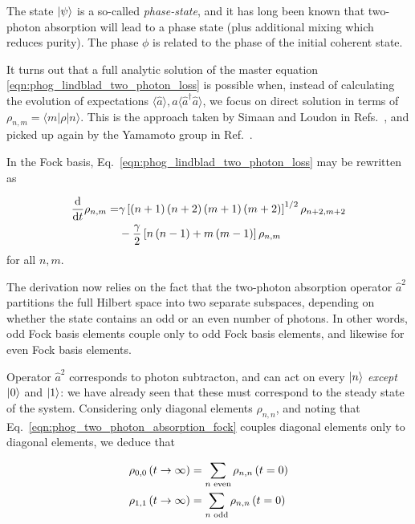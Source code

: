 \noindent The state $\ket{\psi}$ is a so-called \emph{phase-state}, and it has long been known that two-photon absorption will lead to a phase state \cite{Ezaki1999} (plus additional mixing \cite{Alexanian2000, Ezaki2000} which reduces purity). The phase $\phi$ is related to the phase of the initial coherent state. 

It turns out that a full analytic solution of the master equation \ref{eqn:phog_lindblad_two_photon_loss} is possible \cite{Simaan1975, Simaan1976, Ezaki1999, Ezaki2000} when, instead of calculating the evolution of expectations $\langle \hat{a}\rangle, a\langle \hat{a}^\dagger \hat{a}\rangle$, we focus on direct solution in terms of $\rho_{n, m} = \langle m | \rho | n \rangle$. This is the approach taken by Simaan and Loudon in Refs.~\cite{Simaan1975, Simaan1976}, and picked up again by the Yamamoto group in Ref.~\cite{Ezaki1999}. 

In the Fock basis, Eq.~\ref{eqn:phog_lindblad_two_photon_loss} may be rewritten as

\begin{align}\label{eqn:phog_two_photon_absorption_fock}
\frac{\mathrm{d}}{\mathrm{d}t} \rho_{n, m} = &\gamma \left[\left(n+1\right)\left(n+2\right)\left(m+1\right)\left(m+2\right)\right]^{1/2} \rho_{n+2, m+2} \notag \\
&- \frac{\gamma}{2}\left[n\left(n-1\right) + m \left(m-1\right)\right] \rho_{n, m}
\end{align}
for all $n, m$. 

The derivation now relies on the fact that the two-photon absorption operator $\hat{a}^2$ partitions the full Hilbert space into two separate subspaces, depending on whether the state contains an odd or an even number of photons. In other words, odd Fock basis elements couple only to odd Fock basis elements, and likewise for even Fock basis elements. 

Operator $\hat{a}^2$ corresponds to photon subtracton, and can act on every $\ket{n}$ \emph{except} $\ket{0}$ and $\ket{1}$: we have already seen that these must correspond to the steady state of the system. Considering only diagonal elements $\rho_{n, n}$, and noting that Eq.~\ref{eqn:phog_two_photon_absorption_fock} couples diagonal elements only to diagonal elements, we deduce that 

\begin{align}
&\rho_{0, 0}\left(t\rightarrow \infty\right) = \sum_{n \text{ even}} \rho_{n, n}\left(t=0\right) \notag \\
&\rho_{1, 1}\left(t\rightarrow \infty\right) = \sum_{n \text{ odd}} \rho_{n, n}\left(t=0\right) \notag
\end{align}

